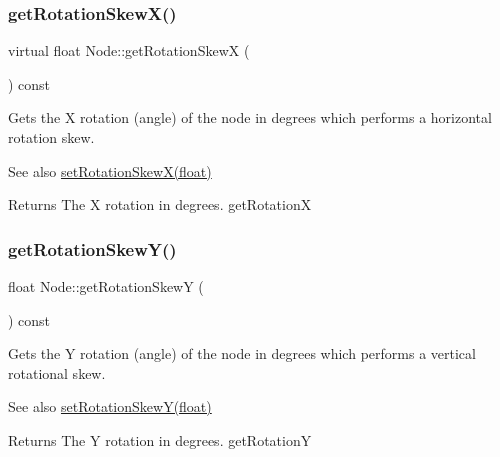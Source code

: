 \subsubsection{\texorpdfstring{get\+Rotation\+Skew\+X()}{getRotationSkewX()}\hspace{0.1cm}{\footnotesize\ttfamily [2/2]}}
{\footnotesize\ttfamily virtual float Node\+::get\+Rotation\+SkewX (\begin{DoxyParamCaption}{ }\end{DoxyParamCaption}) const\hspace{0.3cm}{\ttfamily [virtual]}}

Gets the X rotation (angle) of the node in degrees which performs a horizontal rotation skew.

\begin{DoxySeeAlso}{See also}
{\ttfamily \hyperlink{classNode_a66a533225994dbfe125c3421df4cbb38}{set\+Rotation\+Skew\+X(float)}}
\end{DoxySeeAlso}
\begin{DoxyReturn}{Returns}
The X rotation in degrees.  get\+RotationX 
\end{DoxyReturn}
\mbox{\label{classNode_a6cad8b8118f9530baa3f26659cc1f406}} 
\subsubsection{\texorpdfstring{get\+Rotation\+Skew\+Y()}{getRotationSkewY()}\hspace{0.1cm}{\footnotesize\ttfamily [1/2]}}
{\footnotesize\ttfamily float Node\+::get\+Rotation\+SkewY (\begin{DoxyParamCaption}{ }\end{DoxyParamCaption}) const\hspace{0.3cm}{\ttfamily [virtual]}}

Gets the Y rotation (angle) of the node in degrees which performs a vertical rotational skew.

\begin{DoxySeeAlso}{See also}
{\ttfamily \hyperlink{classNode_a901c5fbd2327fbd6fd14771fd45d71af}{set\+Rotation\+Skew\+Y(float)}}
\end{DoxySeeAlso}
\begin{DoxyReturn}{Returns}
The Y rotation in degrees.  get\+RotationY 
\end{DoxyReturn}
\mbox{\label{classNode_acd3ba7aeb143dbf516bfbdff965ee53a}} 
